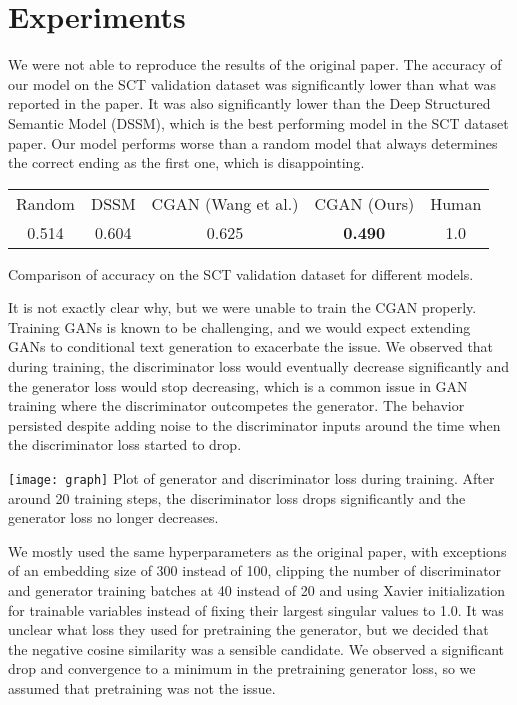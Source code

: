\documentclass{article}
\begin{document}
\section{Experiments}
We were not able to reproduce the results of the original paper. The accuracy of our model on the SCT validation dataset was significantly lower than what was reported in the paper. It was also significantly lower than the Deep Structured Semantic Model (DSSM), which is the best performing model in the SCT dataset paper. Our model performs worse than a random model that always determines the correct ending as the first one, which is disappointing.
\begin{center}
\begin{tabular}{ | c c c c c |}
\hline
Random & DSSM & CGAN (Wang et al.) & CGAN (Ours) & Human \\ 
 0.514 & 0.604 & 0.625 & \textbf{0.490} & 1.0 \\  
 \hline
\end{tabular} 
\par \bigskip
Comparison of accuracy on the SCT validation dataset for different models.
\end{center}
It is not exactly clear why, but we were unable to train the CGAN properly. Training GANs is known to be challenging, and we would expect extending GANs to conditional text generation to exacerbate the issue. We observed that during training, the discriminator loss would eventually decrease significantly and the generator loss would stop decreasing, which is a common issue in GAN training where the discriminator outcompetes the generator. The behavior persisted despite adding noise to the discriminator inputs around the time when the discriminator loss started to drop. 
\begin{center}
 \vspace{-4pt}
\texttt{[image: graph]}
Plot of generator and discriminator loss during training. After around 20 training steps, the discriminator loss drops significantly and the generator loss no longer decreases.
\end{center}
We mostly used the same hyperparameters as the original paper, with exceptions of an embedding size of 300 instead of 100, clipping the number of discriminator and generator training batches at 40 instead of 20 and using Xavier initialization for trainable variables instead of fixing their largest singular values to 1.0. It was unclear what loss they used for pretraining the generator, but we decided that the negative cosine similarity was a sensible candidate.  We observed a significant drop and convergence to a minimum in the pretraining generator loss, so we assumed that pretraining was not the issue.
\end{document}
